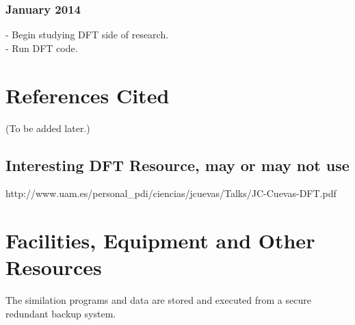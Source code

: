 \documentclass[a4paper,12pt]{article}
\begin{document}
\subsubsection*{January 2014}
- Begin studying DFT side of research.\\
- Run DFT code.

\section*{References Cited}

(To be added later.)

\subsection*{Interesting DFT Resource, may or may not use}

http://www.uam.es/personal\_pdi/ciencias/jcuevas/Talks/JC-Cuevas-DFT.pdf

\section*{Facilities, Equipment and Other Resources}
The similation programs and data are stored and executed from a secure
redundant backup system.
\end{document}
